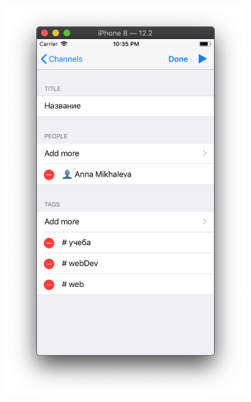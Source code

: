 \documentclass[a4paper,12pt]{article}
\begin{document}
\begin{figure}[h!]
\begin{subfigure}[b]{0.3\linewidth}
		\end{subfigure}
		\begin{subfigure}[b]{0.3\linewidth}
			\includegraphics[width=\linewidth]{../includes/pmi/edit_button_channel.png}
		\end{subfigure}
		\begin{subfigure}[b]{0.3\linewidth}

\end{subfigure}
\end{figure}
\end{document}
